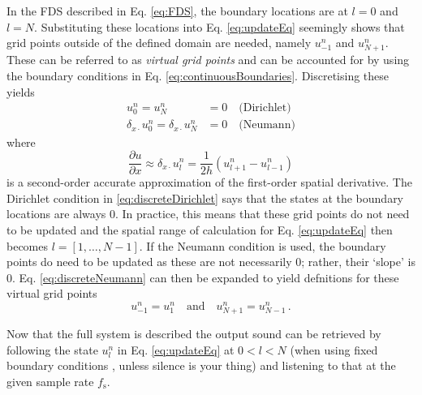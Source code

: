 \documentclass[dvipsnames, reprint]{JASA}
\def\SWcomment[#1]{\textcolor{Bittersweet}{#1}}
\begin{document}
In the FDS described in Eq. \eqref{eq:FDS}, the boundary locations are at $l = 0$ and $l = N$. Substituting these locations into Eq. \eqref{eq:updateEq} seemingly shows that grid points outside of the defined domain are needed, namely $u_{-1}^n$ and $u_{N+1}^n$. These can be referred to as \textit{virtual grid points} and can be accounted for %
by using the boundary conditions in Eq. \eqref{eq:continuousBoundaries}. Discretising these yields
\begin{subequations}
    \begin{align}
        u_0^n = u_N^n &= 0 \quad\text{(Dirichlet)}\label{eq:discreteDirichlet}\\
        \delta_{x\cdot} u_0^n = \delta_{x\cdot} u_N^n &= 0 \quad \text{(Neumann)}\label{eq:discreteNeumann}
    \end{align}
\end{subequations}
where 
\begin{equation}
    \frac{\partial u}{\partial x} \approx \delta_{x\cdot}u_l^n = \frac{1}{2h}\left(u_{l+1}^n - u_{l-1}^n\right)
\end{equation}
is a second-order accurate approximation of the first-order spatial derivative. The Dirichlet condition in \eqref{eq:discreteDirichlet} says that the states at the boundary locations are always 0. In practice, this means that these grid points do not need to be updated and the spatial range of calculation for Eq. \eqref{eq:updateEq} then becomes $l = [1, \hdots, N-1]$. If the Neumann condition is used, the boundary points do need to be updated as these are not necessarily $0$; rather, their `slope' is $0$. Eq. \eqref{eq:discreteNeumann} can then be expanded to yield defnitions for these virtual grid points
\begin{equation}\label{eq:neumannSolution}
    u_{-1}^n = u_1^n \quad \text{and} \quad u_{N+1}^n = u_{N-1}^n\,.
\end{equation}

Now that the full system is described the output sound can be retrieved by following the state $u_l^n$ in Eq. \eqref{eq:updateEq} at $0 < l < N$ (when using fixed boundary conditions \SWcomment[, unless silence is your thing]) and listening to that at the given sample rate $f_\text{s}$.
\end{document}
